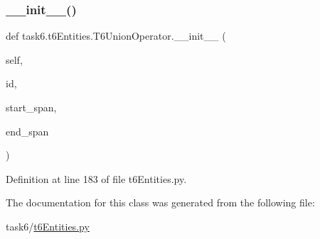 \subsubsection{\texorpdfstring{\+\_\+\+\_\+init\+\_\+\+\_\+()}{\_\_init\_\_()}}
{\footnotesize\ttfamily def task6.\+t6\+Entities.\+T6\+Union\+Operator.\+\_\+\+\_\+init\+\_\+\+\_\+ (\begin{DoxyParamCaption}\item[{}]{self,  }\item[{}]{id,  }\item[{}]{start\+\_\+span,  }\item[{}]{end\+\_\+span }\end{DoxyParamCaption})}



Definition at line 183 of file t6\+Entities.\+py.



The documentation for this class was generated from the following file\+:\begin{DoxyCompactItemize}
\item 
task6/\hyperlink{t6Entities_8py}{t6\+Entities.\+py}\end{DoxyCompactItemize}
